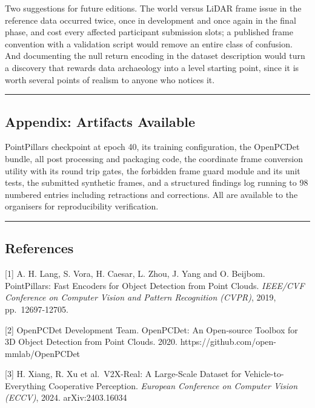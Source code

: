 \documentclass[
  10pt,
]{article}
\begin{document}
Two suggestions for future editions. The world versus LiDAR frame issue
in the reference data occurred twice, once in development and once again
in the final phase, and cost every affected participant submission
slots; a published frame convention with a validation script would
remove an entire class of confusion. And documenting the null return
encoding in the dataset description would turn a discovery that rewards
data archaeology into a level starting point, since it is worth several
points of realism to anyone who notices it.

\begin{center}\rule{0.5\linewidth}{0.5pt}\end{center}

\subsection{Appendix: Artifacts
Available}\label{appendix-artifacts-available}

PointPillars checkpoint at epoch 40, its training configuration, the
OpenPCDet bundle, all post processing and packaging code, the coordinate
frame conversion utility with its round trip gates, the forbidden frame
guard module and its unit tests, the submitted synthetic frames, and a
structured findings log running to 98 numbered entries including
retractions and corrections. All are available to the organisers for
reproducibility verification.

\begin{center}\rule{0.5\linewidth}{0.5pt}\end{center}

\subsection{References}\label{references}

{[}1{]} A. H. Lang, S. Vora, H. Caesar, L. Zhou, J. Yang and O. Beijbom.
PointPillars: Fast Encoders for Object Detection from Point Clouds.
\emph{IEEE/CVF Conference on Computer Vision and Pattern Recognition
(CVPR)}, 2019, pp.~12697-12705.

{[}2{]} OpenPCDet Development Team. OpenPCDet: An Open-source Toolbox
for 3D Object Detection from Point Clouds. 2020.
https://github.com/open-mmlab/OpenPCDet

{[}3{]} H. Xiang, R. Xu et al.~V2X-Real: A Large-Scale Dataset for
Vehicle-to-Everything Cooperative Perception. \emph{European Conference
on Computer Vision (ECCV)}, 2024. arXiv:2403.16034
\end{document}
